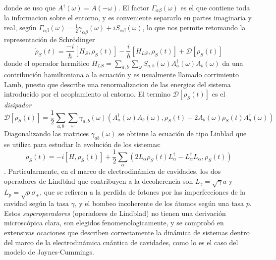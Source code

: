 donde se uso que $A^\dagger(\omega)=A(-\omega)$. El factor $\Gamma_{\alpha\beta}(\omega)$ es el que contiene toda la informacion sobre el entorno, y es conveniente separarlo en partes imaginaria y real, según $\Gamma_{\alpha\beta}(\omega)=\frac{1}{2}\gamma_{\alpha\beta}(\omega)+iS_{\alpha\beta}(\omega)$, lo que nos permite retomando la representación de Schrödinger
\begin{equation}
    \dot \rho_S(t)=\frac{-i}{\hbar}[H_S,\rho_S(t)]-\frac{i}{\hbar}[H_{LS},\rho_S(t)]+\mathcal{D}[\rho_S(t)]
\end{equation}
donde el operador hermítico $H_{LS}=\sum_{a,b}\sum_\omega S_{a,b}(\omega)A^\dagger_a(\omega)A_b(\omega)$ da una contribución hamiltoniana a la ecuación y es usualmente llamado corrimiento Lamb, puesto que describe una renormalizacion de las energias del sistema introducido por el acoplamiento al entorno. El termino $\mathcal{D}[\rho_S(t)]$ es el \textit{disipador}
\begin{equation}
    \mathcal{D}[\rho_S(t)]=\frac{1}{2}\sum_{a,b}\sum_\omega \gamma_{a,b}(\omega) \left( {A^\dagger_a(\omega)A_b(\omega),\rho_S(t)}-2A_b(\omega)\rho_S(t)A^\dagger_a(\omega)\right)
\end{equation}
Diagonalizando las matrices $\gamma_{ab}(\omega)$ se obtiene la ecuación de tipo Linblad que se utiliza para estudiar la evolución de los sistemas:
\begin{equation}
    \dot \rho_S(t)=-i [H,\rho_S(t)]+\frac{1}{2}\sum_\alpha \left(2L_\alpha\rho_S(t)L^\dagger_\alpha-{L^\dagger_\alpha L_\alpha,\rho_S(t)} \right)
\end{equation}
. Particularmente, en el marco de electrodinámica de cavidades, los dos operadores de Lindblad que contribuyen a la decoherencia son $L_\gamma=\sqrt{\gamma}a$ y $L_p=\sqrt{p} \sigma_+$, que se refieren a la perdida de fotones por las imperfecciones de la cavidad según la tasa $\gamma$, y el bombeo incoherente de los átomos según una tasa $p$. Estos \textit{superoperadores} (operadores de Lindblad) no tienen una derivación microscópica clara, son elegidos fenomenologicamente, y se comprobó en extensivas ocaciones que describen correctamente la dinámica de sistemas dentro del marco de la electrodinámica cuántica de cavidades, como lo es el caso del modelo de Jaynes-Cummings.
